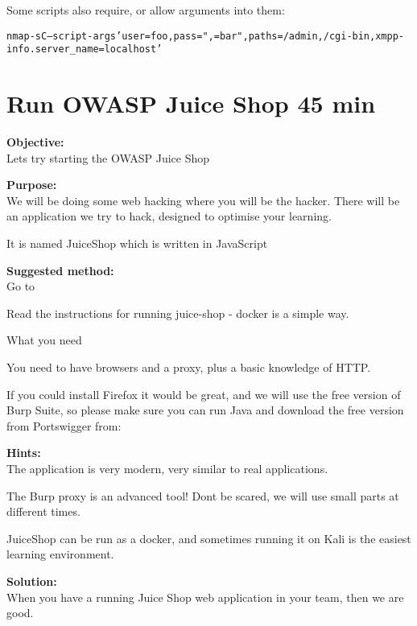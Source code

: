 \documentclass[a4paper,11pt,notitlepage]{report}
\begin{document}
Some scripts also require, or allow arguments into them:

\begin{alltt}
  nmap -sC --script-args 'user=foo,pass=",{}=bar",paths={/admin,/cgi-bin},xmpp-info.server_name=localhost'
\end{alltt}




\chapter{Run OWASP Juice Shop 45 min}
\label{ex:sw-startjuice}


{\bf Objective:}\\
Lets try starting the OWASP Juice Shop

{\bf Purpose:}\\
We will be doing some web hacking where you will be the hacker. There
will be an application we try to hack, designed to
optimise your learning.

It is named JuiceShop which is written in JavaScript

{\bf Suggested method:}\\
Go to 

Read the instructions for running juice-shop - docker is a simple way.

What you need

You need to have browsers and a proxy, plus a basic knowledge of HTTP.

If you could install Firefox it would be great, and we will use the
free version of Burp Suite, so please make sure you can run Java and
download the free version from Portswigger from:



{\bf Hints:}\\
The application is very modern, very similar to real applications.

The Burp proxy is an advanced tool! Dont be scared, we will use small parts at different times.

JuiceShop can be run as a docker, and sometimes running it on Kali is the easiest learning environment.

{\bf Solution:}\\
When you have a running Juice Shop web application in your team, then we are good.
\end{document}
